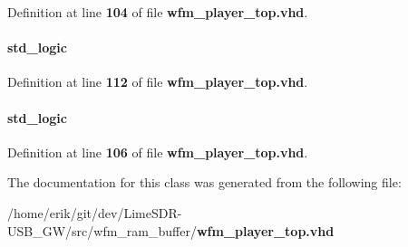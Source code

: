 Definition at line {\bf 104} of file {\bf wfm\+\_\+player\+\_\+top.\+vhd}.

\paragraph[{wfm\+\_\+player\+\_\+wcmd\+\_\+reset\+\_\+n}]{ {\bfseries \textcolor{comment}{std\+\_\+logic}\textcolor{vhdlchar}{ }} \hspace{0.3cm}{\ttfamily [Signal]}}\label{classwfm__player__top_1_1arch_a33a95f2e6679afb9bb058cc95a67bd7d}


Definition at line {\bf 112} of file {\bf wfm\+\_\+player\+\_\+top.\+vhd}.

\paragraph[{wfm\+\_\+player\+\_\+wcmd\+\_\+wr}]{ {\bfseries \textcolor{comment}{std\+\_\+logic}\textcolor{vhdlchar}{ }} \hspace{0.3cm}{\ttfamily [Signal]}}\label{classwfm__player__top_1_1arch_a02614436fc1cdb3e71466b26c2a71822}


Definition at line {\bf 106} of file {\bf wfm\+\_\+player\+\_\+top.\+vhd}.



The documentation for this class was generated from the following file\+:\begin{DoxyCompactItemize}
\item 
/home/erik/git/dev/\+Lime\+S\+D\+R-\/\+U\+S\+B\+\_\+\+G\+W/src/wfm\+\_\+ram\+\_\+buffer/{\bf wfm\+\_\+player\+\_\+top.\+vhd}\end{DoxyCompactItemize}
